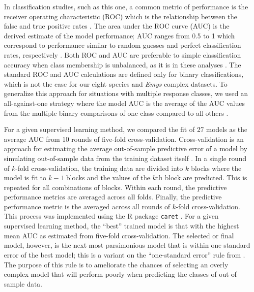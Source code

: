 \documentclass[11pt]{article}
\begin{document}
In classification studies, such as this one, a common metric of performance is the receiver operating characteristic (ROC) which is the relationship between the false and true positive rates \citep{Hastie2009}. The area under the ROC curve (AUC) is the derived estimate of the model performance; AUC ranges from 0.5 to 1 which correspond to performance similar to random guesses and perfect classification rates, respectively \citep{Hastie2009}. Both ROC and AUC are preferable to simple classification accuracy when class membership is unbalanced, as it is in these analyses \citep{Hastie2009}. The standard ROC and AUC calculations are defined only for binary classifications, which is not the case for our eight species and \textit{Emys} complex datasets. To generalize this approach for situations with multiple response classes, we used an all-against-one strategy where the model AUC is the average of the AUC values from the multiple binary comparisons of one class compared to all others \citep{Hand2001}. 

For a given supervised learning method, we compared the fit of 27 models as the average AUC from 10 rounds of five-fold cross-validation. Cross-validation is an approach for estimating the average out-of-sample predictive error of a model by simulating out-of-sample data from the training dataset itself \citep{Hastie2009}. In a single round of \(k\)-fold cross-validation, the training data are divided into \(k\) blocks where the model is fit to \(k - 1\) blocks and the values of the \(k\)th block are predicted. This is repeated for all combinations of blocks. Within each round, the predictive performance metrics are averaged across all folds. Finally, the predictive performance metric is the averaged across all rounds of \(k\)-fold cross-validation. This process was implemented using the R package \texttt{caret} \citep{KuhnMAN2013}. For a given supervised learning method, the ``best'' trained model is that with the highest mean AUC as estimated from five-fold cross-validation. The selected or final model, however, is the next most parsimonious model that is within one standard error of the best model; this is a variant on the ``one-standard error'' rule from \citet{Hastie2009}. The purpose of this rule is to ameliorate the chances of selecting an overly complex model that will perform poorly when predicting the classes of out-of-sample data.
\end{document}
